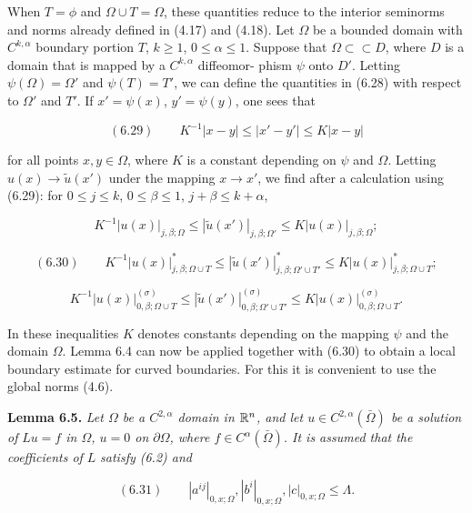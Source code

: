 \noindent When $T=\phi$ and $\Omega \cup T=\Omega$, these quantities reduce to the interior seminorms and
norms already defined in (4.17) and (4.18).
Let $\Omega$ be a bounded domain with $C^{k,\alpha}$ boundary portion $T$, $k\ge 1$, $0\le \alpha \le 1$.
Suppose that $\Omega \subset \subset D$, where $D$ is a domain that is mapped by a $C^{k,\alpha}$ diffeomor-
phism $\psi$ onto $D'$. Letting $\psi(\Omega)=\Omega'$ and $\psi(T)=T'$, we can define the quantities in
(6.28) with respect to $\Omega'$ and $T'$. If $x'=\psi(x)$, $y'=\psi(y)$, one sees that

\begin{equation}
(6.29)\qquad K^{-1}|x-y|\le |x'-y'|\le K|x-y|
\end{equation}

\noindent for all points $x,y\in\Omega$, where $K$ is a constant depending on $\psi$ and $\Omega$. Letting
$u(x)\to \tilde{u}(x')$ under the mapping $x\to x'$, we find after a calculation using (6.29): for
$0\le j\le k$, $0\le \beta \le 1$, $j+\beta\le k+\alpha$,

\[
K^{-1}|u(x)|_{j,\beta;\Omega} \le |\tilde{u}(x')|_{j,\beta;\Omega'}
\le K|u(x)|_{j,\beta;\Omega};
\]

\begin{equation}
(6.30)\qquad
K^{-1}|u(x)|^{\ast}_{j,\beta;\Omega\cup T} \le |\tilde{u}(x')|^{\ast}_{j,\beta;\Omega'\cup T'}
\le K|u(x)|^{\ast}_{j,\beta;\Omega\cup T};
\end{equation}

\[
K^{-1}|u(x)|^{(\sigma)}_{0,\beta;\Omega\cup T} \le |\tilde{u}(x')|^{(\sigma)}_{0,\beta;\Omega'\cup T'}
\le K|u(x)|^{(\sigma)}_{0,\beta;\Omega\cup T}.
\]

\noindent In these inequalities $K$ denotes constants depending on the mapping $\psi$ and the
domain $\Omega$.
Lemma 6.4 can now be applied together with (6.30) to obtain a local boundary
estimate for curved boundaries. For this it is convenient to use the global norms
(4.6).

\noindent \textbf{Lemma 6.5.} \textit{Let $\Omega$ be a $C^{2,\alpha}$ domain in $\mathbb{R}^n$, and let $u \in C^{2,\alpha}(\bar{\Omega})$ be a solution of}
\textit{$Lu=f$ in $\Omega$, $u=0$ on $\partial\Omega$, where $f \in C^{\alpha}(\bar{\Omega})$. It is assumed that the coefficients of $L$}
\textit{satisfy (6.2) and}

\begin{equation}
(6.31)\qquad |a^{ij}|_{0,x;\Omega}, |b^i|_{0,x;\Omega}, |c|_{0,x;\Omega}\le \Lambda.
\end{equation}


